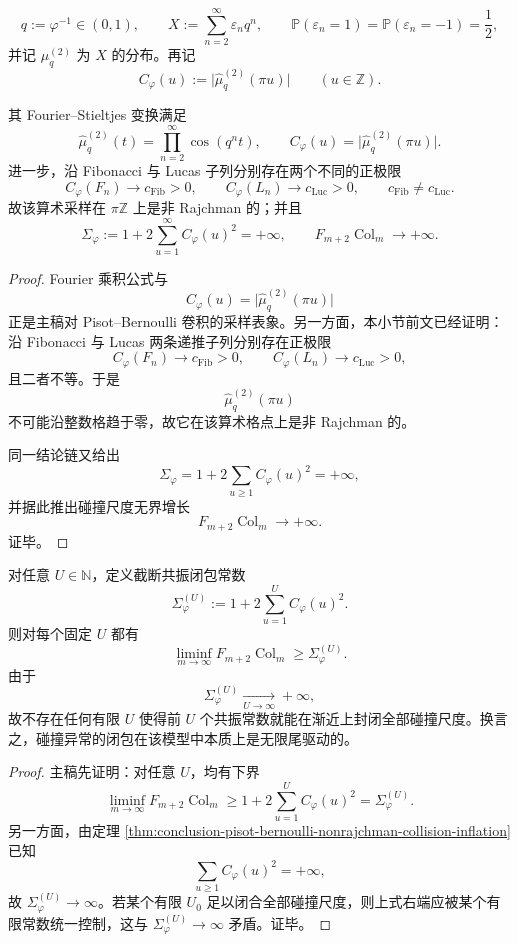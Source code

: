 \[
q:=\varphi^{-1}\in(0,1),
\qquad
X:=\sum_{n=2}^{\infty}\varepsilon_n q^n,
\qquad
\mathbb P(\varepsilon_n=1)=\mathbb P(\varepsilon_n=-1)=\frac12,
\]
并记 \(\mu_q^{(2)}\) 为 \(X\) 的分布。再记
\[
C_\varphi(u):=\bigl|\widehat\mu_q^{(2)}(\pi u)\bigr|
\qquad (u\in\mathbb Z).
\]

\begin{theorem}\label{thm:conclusion-pisot-bernoulli-nonrajchman-collision-inflation}
其 Fourier--Stieltjes 变换满足
\[
\widehat\mu_q^{(2)}(t)=\prod_{n=2}^{\infty}\cos(q^n t),
\qquad
C_\varphi(u)=\bigl|\widehat\mu_q^{(2)}(\pi u)\bigr|.
\]
进一步，沿 Fibonacci 与 Lucas 子列分别存在两个不同的正极限
\[
C_\varphi(F_n)\to c_{\mathrm{Fib}}>0,
\qquad
C_\varphi(L_n)\to c_{\mathrm{Luc}}>0,
\qquad
c_{\mathrm{Fib}}\neq c_{\mathrm{Luc}}.
\]
故该算术采样在 \(\pi\mathbb Z\) 上是非 Rajchman 的；并且
\[
\Sigma_\varphi:=1+2\sum_{u=1}^{\infty}C_\varphi(u)^2=+\infty,
\qquad
F_{m+2}\operatorname{Col}_m\longrightarrow +\infty.
\]
\end{theorem}
\begin{proof}
Fourier 乘积公式与
\[
C_\varphi(u)=\bigl|\widehat\mu_q^{(2)}(\pi u)\bigr|
\]
正是主稿对 Pisot--Bernoulli 卷积的采样表象。另一方面，本小节前文已经证明：沿 Fibonacci 与 Lucas 两条递推子列分别存在正极限
\[
C_\varphi(F_n)\to c_{\mathrm{Fib}}>0,
\qquad
C_\varphi(L_n)\to c_{\mathrm{Luc}}>0,
\]
且二者不等。于是
\[
\widehat\mu_q^{(2)}(\pi u)
\]
不可能沿整数格趋于零，故它在该算术格点上是非 Rajchman 的。

同一结论链又给出
\[
\Sigma_\varphi=1+2\sum_{u\ge1}C_\varphi(u)^2=+\infty,
\]
并据此推出碰撞尺度无界增长
\[
F_{m+2}\operatorname{Col}_m\to+\infty.
\]
证毕。
\end{proof}

\begin{theorem}[有限共振闭包不可能性]\label{thm:conclusion-no-finite-resonance-closure}
对任意 \(U\in\mathbb N\)，定义截断共振闭包常数
\[
\Sigma_\varphi^{(U)}:=1+2\sum_{u=1}^{U}C_\varphi(u)^2.
\]
则对每个固定 \(U\) 都有
\[
\liminf_{m\to\infty}F_{m+2}\operatorname{Col}_m
\ge
\Sigma_\varphi^{(U)}.
\]
由于
\[
\Sigma_\varphi^{(U)}\xrightarrow[U\to\infty]{}+\infty,
\]
故不存在任何有限 \(U\) 使得前 \(U\) 个共振常数就能在渐近上封闭全部碰撞尺度。换言之，碰撞异常的闭包在该模型中本质上是无限尾驱动的。
\end{theorem}
\begin{proof}
主稿先证明：对任意 \(U\)，均有下界
\[
\liminf_{m\to\infty}F_{m+2}\operatorname{Col}_m
\ge
1+2\sum_{u=1}^{U}C_\varphi(u)^2
=
\Sigma_\varphi^{(U)}.
\]
另一方面，由定理 \ref{thm:conclusion-pisot-bernoulli-nonrajchman-collision-inflation} 已知
\[
\sum_{u\ge1}C_\varphi(u)^2=+\infty,
\]
故 \(\Sigma_\varphi^{(U)}\to\infty\)。若某个有限 \(U_0\) 足以闭合全部碰撞尺度，则上式右端应被某个有限常数统一控制，这与 \(\Sigma_\varphi^{(U)}\to\infty\) 矛盾。证毕。
\end{proof}

